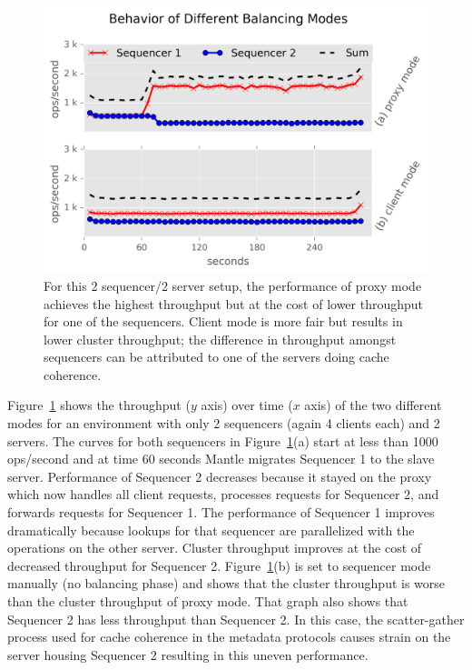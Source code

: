 \documentclass[preprint]{sigplanconf-eurosys}
\begin{document}
\begin{figure}[t!]
\centering
\includegraphics{figures/mantle-mode-behavior.png}
\caption{For this 2 sequencer/2 server setup, the performance of proxy mode
achieves the highest throughput but at the cost of lower throughput for one of
the sequencers. Client mode is more fair but results in lower cluster
throughput; the difference in throughput amongst sequencers can be attributed
to one of the servers doing cache coherence.
}\label{fig:mantle-mode-behavior}
\end{figure}

Figure~\ref{fig:mantle-mode-behavior} shows the throughput (\(y\) axis) over
time (\(x\) axis) of the two different modes for an environment with only 2
sequencers (again 4 clients each) and 2 servers. The curves for both sequencers
in Figure~\ref{fig:mantle-mode-behavior}(a) start at less than 1000 ops/second
and at time 60 seconds Mantle migrates Sequencer 1 to the slave server.
Performance of Sequencer 2 decreases because it stayed on the proxy which now
handles all client requests, processes requests for Sequencer 2, and forwards
requests for Sequencer 1. The performance of Sequencer 1 improves dramatically
because lookups for that sequencer are parallelized with the operations on the
other server. Cluster throughput improves at the cost of decreased throughput
for Sequencer 2.  Figure~\ref{fig:mantle-mode-behavior}(b) is set to sequencer
mode manually (no balancing phase) and shows that the cluster throughput is
worse than the cluster throughput of proxy mode. That graph also shows that
Sequencer 2 has less throughput than Sequencer 2. In this case, the
scatter-gather process used for cache coherence in the metadata protocols
causes strain on the server housing Sequencer 2 resulting in this uneven
performance. 
\end{document}
